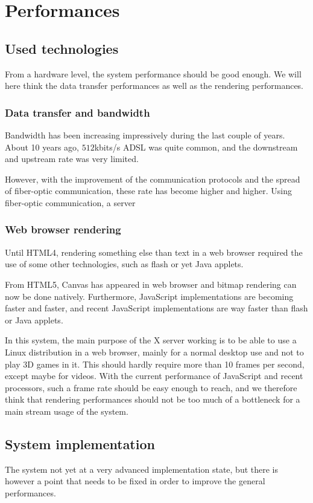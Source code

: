 \section{Performances}
%
\subsection{Used technologies}
From a hardware level, the system performance should be good enough. We will 
here think the data transfer performances as well as the rendering performances.
%
\subsubsection{Data transfer and bandwidth}
%
Bandwidth has been increasing impressively during the last couple of years. 
About 10 years ago, $512$kbits/s ADSL was quite common, and the downstream and 
upstream rate was very limited. 

However, with the improvement of the communication protocols and the 
spread of fiber-optic communication, these rate has become higher and higher.
Using fiber-optic communication, a server 
%
\subsubsection{Web browser rendering}
%
Until HTML4, rendering something else than text in a web browser required the 
use of some other technologies, such as flash or yet Java applets. 

From HTML5, Canvas has appeared in web browser and bitmap rendering can now 
be done natively. Furthermore, JavaScript implementations
are becoming faster and faster, and recent JavaScript implementations 
are way faster than flash or Java applets\cite{js-vs-as}.

In this system, the main purpose of the X server working is to be able to use
a Linux distribution in a web browser, mainly for a normal desktop use and 
not to play 3D games in it. This should hardly require more than 10 frames per second, 
except maybe for videos. With the current performance of JavaScript and 
recent processors, such a frame rate should be easy enough to reach, and we 
therefore think that rendering performances should not be too much of a bottleneck 
for a main stream usage of the system.
%
\subsection{System implementation}
%
The system not yet at a very advanced implementation state, but there is however a point that 
needs to be fixed in order to improve the general performances.

